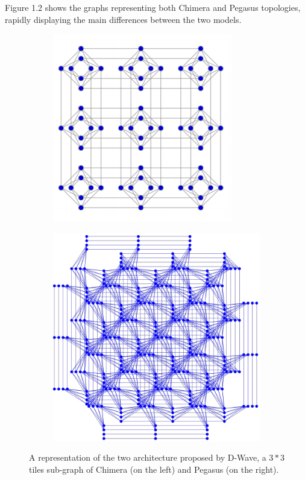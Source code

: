 Figure 1.2 shows the graphs representing both Chimera and Pegasus topologies, rapidly displaying the main differences between the two models. 
\begin{figure}[t]
    \begin{subfigure}{.5\textwidth}
        \centering
	    \includegraphics{QATile.PNG}
    \end{subfigure}
    \begin{subfigure}{.5\textwidth}
        \begin{center}
	    \includegraphics[width=\textwidth]{Pegas.PNG}
	    \end{center}
	\end{subfigure}
	\caption{A representation of the two architecture proposed by D-Wave, a $3*3$ tiles sub-graph of Chimera (on the left) and Pegasus (on the right).}
\end{figure}

\pagebreak


